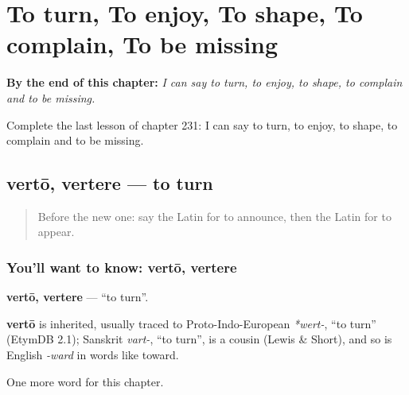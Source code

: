 
\chapter{To turn, To enjoy, To shape, To complain, To be missing}
\label{ch:la-to-turn-to-enjoy-to-shape-to-complain-to-be-missing}

\begin{chapteropening}
\textbf{By the end of this chapter:} \emph{I can say to turn, to enjoy, to shape, to complain and to be missing.}

Complete the last lesson of chapter 231: I can say to turn, to enjoy, to shape, to complain and to be missing.
\end{chapteropening}

\section[vertō, vertere]{vertō, vertere — to turn}

\label{lesson:LA-C231-verto}



\begin{quote}
Before the new one: say the Latin for to announce, then the Latin for to appear.
\end{quote}

\subsection*{You'll want to know: vertō, vertere}
\textbf{vertō, vertere} — \textquotedblleft{}to turn\textquotedblright{}.

\begin{cousinweb}
\textbf{vertō} is inherited, usually traced to Proto-Indo-European \emph{*wert-}, \textquotedblleft{}to turn\textquotedblright{} (EtymDB 2.1); Sanskrit \emph{vart-}, \textquotedblleft{}to turn\textquotedblright{}, is a cousin (Lewis \& Short), and so is English \emph{-ward} in words like toward.
\end{cousinweb}

\begin{grammarlens}[title={What you've built}]
One more word for this chapter.
\end{grammarlens}

